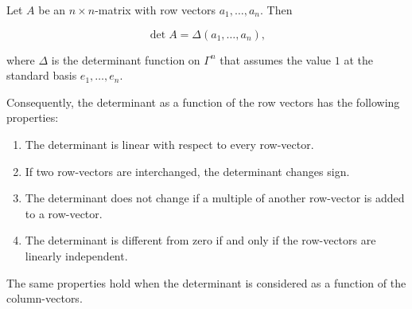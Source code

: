 Let $A$ be an $n \times n$-matrix with row vectors $a_1, \ldots, a_n$. Then

$$\det A = \Delta(a_1, \ldots, a_n),$$

where $\Delta$ is the determinant function on $\Gamma^n$ that assumes the value $1$ at the standard basis $e_1, \ldots, e_n$.

Consequently, the determinant as a function of the row vectors has the following properties:
\begin{enumerate}
  \item The determinant is linear with respect to every row-vector.
  \item If two row-vectors are interchanged, the determinant changes sign.
  \item The determinant does not change if a multiple of another row-vector is added to a row-vector.
  \item The determinant is different from zero if and only if the row-vectors are linearly independent.
\end{enumerate}

The same properties hold when the determinant is considered as a function of the column-vectors.
